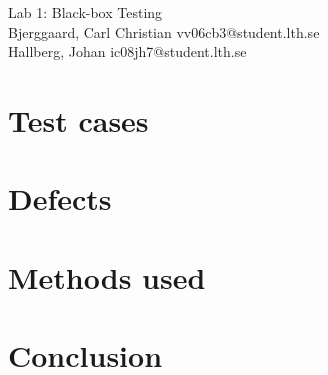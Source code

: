 \documentclass[titlepage]{article}
\begin{document}
\begin{center}
	\huge{Lab 1: Black-box Testing } \\
	\small{Bjerggaard, Carl Christian vv06cb3@student.lth.se \\Hallberg, Johan ic08jh7@student.lth.se}

\vspace*{1cm}

\end{center}

\thispagestyle{empty}

\clearpage
\section{Test cases}
\label{testcases}
%


\section{Defects}
\label{defects}


\section{Methods used}
\label{methods}
%

\section{Conclusion}
\label{conclusion}
%
\end{document}
